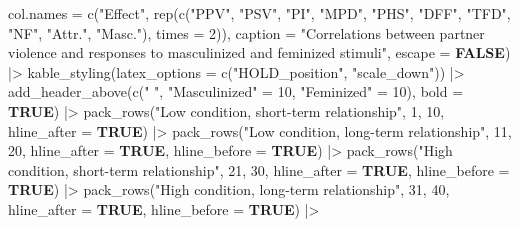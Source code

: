 \documentclass[
  bookmarksnumbered]{article}
\newenvironment{Shaded}{\begin{snugshade}}{\end{snugshade}}
\newcommand{\AttributeTok}[1]{\textcolor[rgb]{0.80,0.80,0.80}{#1}}
\newcommand{\ConstantTok}[1]{\textcolor[rgb]{0.86,0.64,0.64}{\textbf{#1}}}
\newcommand{\DecValTok}[1]{\textcolor[rgb]{0.86,0.86,0.80}{#1}}
\newcommand{\FunctionTok}[1]{\textcolor[rgb]{0.94,0.94,0.56}{#1}}
\newcommand{\NormalTok}[1]{\textcolor[rgb]{0.80,0.80,0.80}{#1}}
\newcommand{\OtherTok}[1]{\textcolor[rgb]{0.94,0.94,0.56}{#1}}
\newcommand{\SpecialCharTok}[1]{\textcolor[rgb]{0.86,0.64,0.64}{#1}}
\newcommand{\StringTok}[1]{\textcolor[rgb]{0.80,0.58,0.58}{#1}}
\begin{document}
\begin{Shaded}
\begin{Highlighting}[]
        \AttributeTok{col.names =} \FunctionTok{c}\NormalTok{(}\StringTok{"Effect"}\NormalTok{,}
                      \FunctionTok{rep}\NormalTok{(}\FunctionTok{c}\NormalTok{(}\StringTok{"PPV"}\NormalTok{, }\StringTok{"PSV"}\NormalTok{, }\StringTok{"PI"}\NormalTok{, }\StringTok{"MPD"}\NormalTok{, }\StringTok{"PHS"}\NormalTok{, }\StringTok{"DFF"}\NormalTok{, }
                            \StringTok{"TFD"}\NormalTok{, }\StringTok{"NF"}\NormalTok{, }\StringTok{"Attr."}\NormalTok{, }\StringTok{"Masc."}\NormalTok{), }\AttributeTok{times =} \DecValTok{2}\NormalTok{)),}
        \AttributeTok{caption =} \StringTok{"Correlations between partner violence and responses to masculinized and }
\StringTok{        feminized stimuli"}\NormalTok{,}
        \AttributeTok{escape =} \ConstantTok{FALSE}\NormalTok{) }\SpecialCharTok{|\textgreater{}}
  \FunctionTok{kable\_styling}\NormalTok{(}\AttributeTok{latex\_options =} \FunctionTok{c}\NormalTok{(}\StringTok{"HOLD\_position"}\NormalTok{, }\StringTok{"scale\_down"}\NormalTok{)) }\SpecialCharTok{|\textgreater{}} 
  \FunctionTok{add\_header\_above}\NormalTok{(}\FunctionTok{c}\NormalTok{(}\StringTok{" "}\NormalTok{,}
                     \StringTok{"Masculinized"} \OtherTok{=} \DecValTok{10}\NormalTok{, }
                     \StringTok{"Feminized"} \OtherTok{=} \DecValTok{10}\NormalTok{),}
                   \AttributeTok{bold =} \ConstantTok{TRUE}\NormalTok{) }\SpecialCharTok{|\textgreater{}} 
  \FunctionTok{pack\_rows}\NormalTok{(}\StringTok{"Low condition, short{-}term relationship"}\NormalTok{, }\DecValTok{1}\NormalTok{, }\DecValTok{10}\NormalTok{,}
            \AttributeTok{hline\_after =} \ConstantTok{TRUE}\NormalTok{) }\SpecialCharTok{|\textgreater{}} 
  \FunctionTok{pack\_rows}\NormalTok{(}\StringTok{"Low condition, long{-}term relationship"}\NormalTok{, }\DecValTok{11}\NormalTok{, }\DecValTok{20}\NormalTok{,}
            \AttributeTok{hline\_after =} \ConstantTok{TRUE}\NormalTok{, }\AttributeTok{hline\_before =} \ConstantTok{TRUE}\NormalTok{) }\SpecialCharTok{|\textgreater{}}
  \FunctionTok{pack\_rows}\NormalTok{(}\StringTok{"High condition, short{-}term relationship"}\NormalTok{, }\DecValTok{21}\NormalTok{, }\DecValTok{30}\NormalTok{,}
            \AttributeTok{hline\_after =} \ConstantTok{TRUE}\NormalTok{, }\AttributeTok{hline\_before =} \ConstantTok{TRUE}\NormalTok{) }\SpecialCharTok{|\textgreater{}} 
  \FunctionTok{pack\_rows}\NormalTok{(}\StringTok{"High condition, long{-}term relationship"}\NormalTok{, }\DecValTok{31}\NormalTok{, }\DecValTok{40}\NormalTok{,}
            \AttributeTok{hline\_after =} \ConstantTok{TRUE}\NormalTok{, }\AttributeTok{hline\_before =} \ConstantTok{TRUE}\NormalTok{) }\SpecialCharTok{|\textgreater{}} 

\end{Highlighting}
\end{Shaded}
\end{document}
